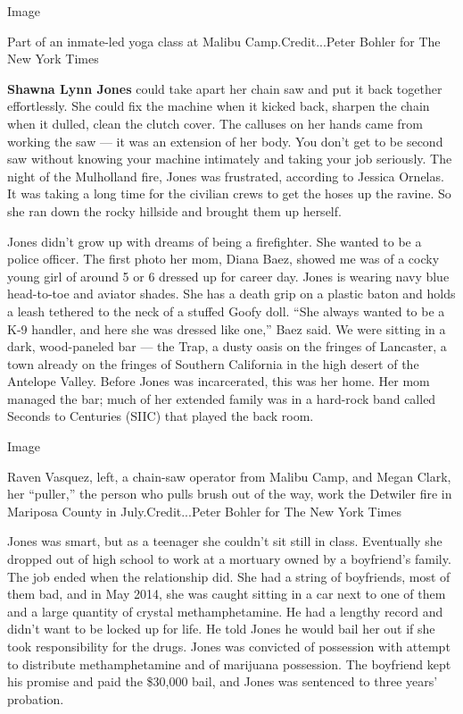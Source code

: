 Image

Part of an inmate-led yoga class at Malibu Camp.Credit...Peter Bohler
for The New York Times

\textbf{Shawna Lynn Jones} could take apart her chain saw and put it
back together effortlessly. She could fix the machine when it kicked
back, sharpen the chain when it dulled, clean the clutch cover. The
calluses on her hands came from working the saw --- it was an extension
of her body. You don't get to be second saw without knowing your machine
intimately and taking your job seriously. The night of the Mulholland
fire, Jones was frustrated, according to Jessica Ornelas. It was taking
a long time for the civilian crews to get the hoses up the ravine. So
she ran down the rocky hillside and brought them up herself.

Jones didn't grow up with dreams of being a firefighter. She wanted to
be a police officer. The first photo her mom, Diana Baez, showed me was
of a cocky young girl of around 5 or 6 dressed up for career day. Jones
is wearing navy blue head-to-toe and aviator shades. She has a death
grip on a plastic baton and holds a leash tethered to the neck of a
stuffed Goofy doll. ``She always wanted to be a K-9 handler, and here
she was dressed like one,'' Baez said. We were sitting in a dark,
wood-paneled bar --- the Trap, a dusty oasis on the fringes of
Lancaster, a town already on the fringes of Southern California in the
high desert of the Antelope Valley. Before Jones was incarcerated, this
was her home. Her mom managed the bar; much of her extended family was
in a hard-rock band called Seconds to Centuries (SIIC) that played the
back room.

Image

Raven Vasquez, left, a chain-saw operator from Malibu Camp, and Megan
Clark, her ``puller,'' the person who pulls brush out of the way, work
the Detwiler fire in Mariposa County in July.Credit...Peter Bohler for
The New York Times

Jones was smart, but as a teenager she couldn't sit still in class.
Eventually she dropped out of high school to work at a mortuary owned by
a boyfriend's family. The job ended when the relationship did. She had a
string of boyfriends, most of them bad, and in May 2014, she was caught
sitting in a car next to one of them and a large quantity of crystal
methamphetamine. He had a lengthy record and didn't want to be locked up
for life. He told Jones he would bail her out if she took responsibility
for the drugs. Jones was convicted of possession with attempt to
distribute methamphetamine and of marijuana possession. The boyfriend
kept his promise and paid the \$30,000 bail, and Jones was sentenced to
three years' probation.


